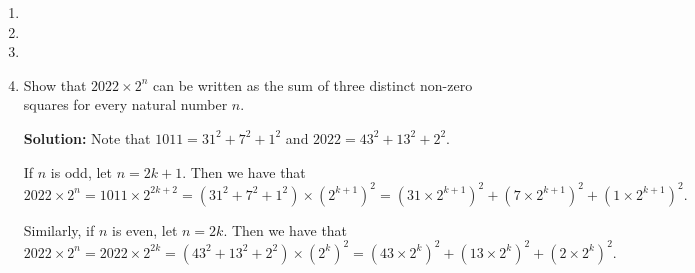 \documentclass{article}
\begin{document}
\begin{enumerate}[itemsep=24pt]
\item


\item 


\item 


\item
Show that $2022 \times 2^n$ can be written as the sum of three distinct non-zero squares for every natural number $n$.

\textbf{Solution:}
Note that $1011 = 31^2 + 7^2 + 1^2$ and $2022 = 43^2 + 13^2 + 2^2$.

If $n$ is odd, let $n = 2k + 1$. Then we have that
\[
    2022 \times 2^n = 1011 \times 2^{2k + 2} = \left( 31^2 + 7^2 + 1^2 \right) \times {\left( 2^{k + 1} \right)}^2 = {\left( 31 \times 2^{k + 1} \right)}^2 + {\left( 7 \times 2^{k + 1} \right)}^2 + {\left( 1 \times 2^{k + 1} \right)}^2.
\]

Similarly, if $n$ is even, let $n = 2k$. Then we have that
\[
    2022 \times 2^n = 2022 \times 2^{2k} = \left( 43^2 + 13^2 + 2^2 \right) \times {\left( 2^{k} \right)}^2 = {\left( 43 \times 2^{k} \right)}^2 + {\left( 13 \times 2^{k} \right)}^2 + {\left( 2 \times 2^{k} \right)}^2.
\]

\end{enumerate}
\end{document}
